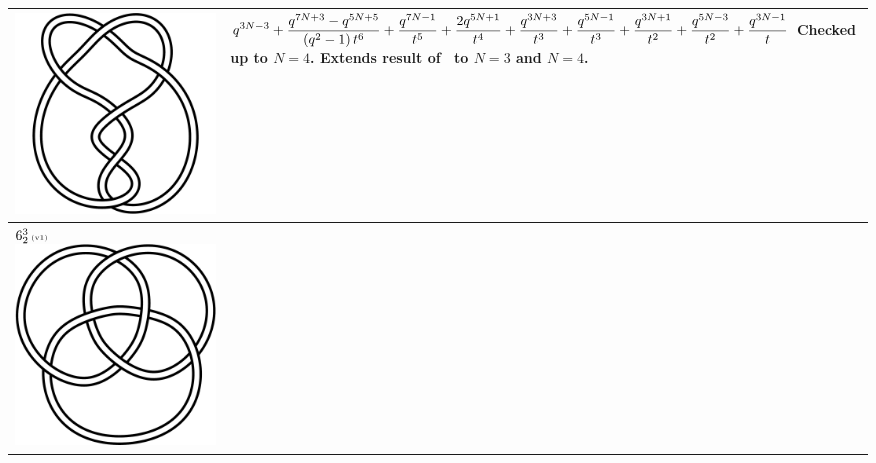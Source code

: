 \documentclass{compositio}
\theoremstyle{definition}
\numberwithin{equation}{section}
\begin{document}
{\begin{longtable}{p{}|p{}}
\includegraphics[scale=0.07,angle=0]{link6_2_2.pdf} 
& 
\newline
$
\displaystyle{%
q^{3 N-3}+\frac{q^{7 N+3}-q^{5 N+5}}{\left(q^2-1\right) t^6}+\frac{q^{7 N-1}}{t^5}+\frac{2 q^{5 N+1}}{t^4}+\frac{q^{3 N+3}}{t^3}+\frac{q^{5 N-1}}{t^3}+\frac{q^{3 N+1}}{t^2}+\frac{q^{5 N-3}}{t^2}+\frac{q^{3 N-1}}{t}
}
$
\newline\newline\newline
Checked up to $N=4$. Extends result of~\cite{r0508510} to $N=3$ and $N=4$.
\\
\hline
$6_{2}^3\,\text{{\tiny (v1)}}$ 
\includegraphics[scale=0.07,angle=0]{link6_2_3.pdf} 

\end{longtable}}
\end{document}
